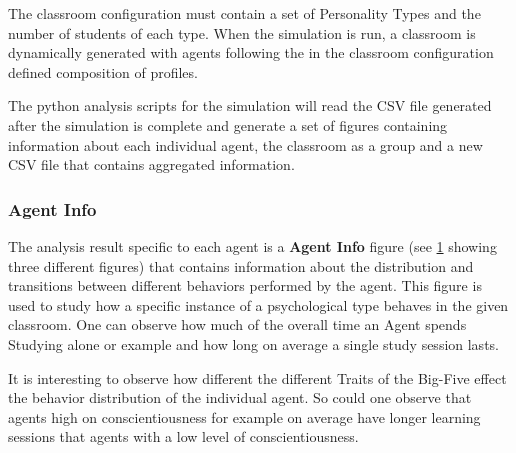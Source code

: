 The classroom configuration must contain a set of Personality Types and the number
of students of each type. When the simulation is run, a classroom is dynamically
generated with agents following the in the classroom configuration defined composition
of profiles.

The python analysis scripts for the simulation will read the CSV file generated
after the simulation is complete and generate a set of figures containing information
about each individual agent, the classroom as a group and a new CSV file that contains
aggregated information.

\subsubsection{Agent Info}
The analysis result specific to each agent is a \textbf{Agent Info} figure (see \ref{AgentInfo} showing
three different figures) that contains information about the distribution and transitions
between different behaviors performed by the agent. This figure is used to study how
a specific instance of a psychological type behaves in the given classroom.
One can observe how much of the overall time an Agent spends Studying alone or example
and how long on average a single study session lasts.

It is interesting to observe how different the different Traits of the Big-Five
effect the behavior distribution of the individual agent. So could one observe that
agents high on conscientiousness for example on average have longer learning sessions
that agents with a low level of conscientiousness.

\begin{figure}[H]
    \label{AgentInfo}
    \hspace*{-2.0\leftmargin}
\end{figure}

